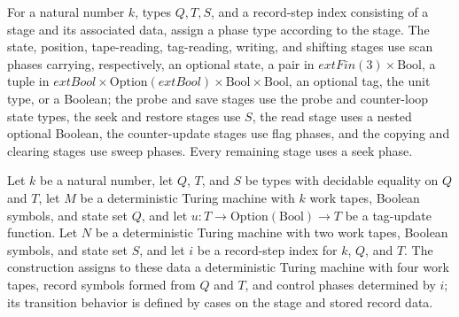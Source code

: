 \begin{definition}
\label{Turing.recordStepPhase}
\leanok
{}
For a natural number $k$, types $Q,T,S$, and a record-step index consisting of a stage
and its associated data, assign a phase type according to the stage. The state,
position, tape-reading, tag-reading, writing, and shifting stages use scan phases
carrying, respectively, an optional state, a pair in $	ext{Fin}(3)\times\mathrm{Bool}$,
a tuple in
$	ext{Bool}\times\mathrm{Option}(	ext{Bool})\times\mathrm{Bool}\times\mathrm{Bool}$, an
optional tag, the unit type, or a Boolean; the probe and save stages use the probe and
counter-loop state types, the seek and restore stages use $S$, the read stage uses a
nested optional Boolean, the counter-update stages use flag phases, and the copying and
clearing stages use sweep phases. Every remaining stage uses a seek phase.
\end{definition}

\begin{definition}
\label{Turing.recordStepRows}
\leanok
{}
Let $k$ be a natural number, let $Q$, $T$, and $S$ be types with decidable equality on
$Q$ and $T$, let $M$ be a deterministic Turing machine with $k$ work tapes, Boolean
symbols, and state set $Q$, and let $u:T\to\mathrm{Option}(\mathrm{Bool})\to T$ be a
tag-update function. Let $N$ be a deterministic Turing machine with two work tapes,
Boolean symbols, and state set $S$, and let $i$ be a record-step index for $k$, $Q$, and
$T$. The construction assigns to these data a deterministic Turing machine with four
work tapes, record symbols formed from $Q$ and $T$, and control phases determined by
$i$; its transition behavior is defined by cases on the stage and stored record data.
\end{definition}

